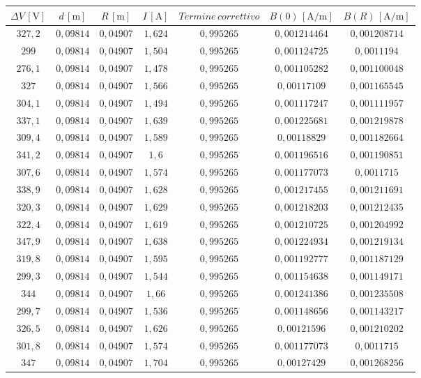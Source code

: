 \documentclass[]{article}
\begin{document}
\begin{table}
    \centering

\begin{tabular}{||c|c|c|c|c|c|c||}
    \hline
    $\Delta V\, [\text{V}] $ & $d\, [\text{m}] $ & $R\, [\text{m}] $ & $I\, [\text{A}] $ & $Termine \, correttivo $ & $B(0)\, [\text{A/m}] $ & $B(R)\, [\text{A/m}] $\\
    \hline\hline



    $327,2$ & $0,09814$ & $0,04907$ & $1,624$ & $0,995265$ & $0,001214464$ & $0,001208714$ \\\hline
    $299  $ & $0,09814$ & $0,04907$ & $1,504$ & $0,995265$ & $0,001124725$ & $0,0011194  $ \\\hline
    $276,1$ & $0,09814$ & $0,04907$ & $1,478$ & $0,995265$ & $0,001105282$ & $0,001100048$ \\\hline
    $327  $ & $0,09814$ & $0,04907$ & $1,566$ & $0,995265$ & $0,00117109 $ & $0,001165545$ \\\hline
    $304,1$ & $0,09814$ & $0,04907$ & $1,494$ & $0,995265$ & $0,001117247$ & $0,001111957$ \\\hline
    $337,1$ & $0,09814$ & $0,04907$ & $1,639$ & $0,995265$ & $0,001225681$ & $0,001219878$ \\\hline
    $309,4$ & $0,09814$ & $0,04907$ & $1,589$ & $0,995265$ & $0,00118829 $ & $0,001182664$ \\\hline
    $341,2$ & $0,09814$ & $0,04907$ & $1,6  $ & $0,995265$ & $0,001196516$ & $0,001190851$ \\\hline
    $307,6$ & $0,09814$ & $0,04907$ & $1,574$ & $0,995265$ & $0,001177073$ & $0,0011715  $ \\\hline
    $338,9$ & $0,09814$ & $0,04907$ & $1,628$ & $0,995265$ & $0,001217455$ & $0,001211691$ \\\hline
    $320,3$ & $0,09814$ & $0,04907$ & $1,629$ & $0,995265$ & $0,001218203$ & $0,001212435$ \\\hline
    $322,4$ & $0,09814$ & $0,04907$ & $1,619$ & $0,995265$ & $0,001210725$ & $0,001204992$ \\\hline
    $347,9$ & $0,09814$ & $0,04907$ & $1,638$ & $0,995265$ & $0,001224934$ & $0,001219134$ \\\hline
    $319,8$ & $0,09814$ & $0,04907$ & $1,595$ & $0,995265$ & $0,001192777$ & $0,001187129$ \\\hline
    $299,3$ & $0,09814$ & $0,04907$ & $1,544$ & $0,995265$ & $0,001154638$ & $0,001149171$ \\\hline
    $344  $ & $0,09814$ & $0,04907$ & $1,66 $ & $0,995265$ & $0,001241386$ & $0,001235508$ \\\hline
    $299,7$ & $0,09814$ & $0,04907$ & $1,536$ & $0,995265$ & $0,001148656$ & $0,001143217$ \\\hline
    $326,5$ & $0,09814$ & $0,04907$ & $1,626$ & $0,995265$ & $0,00121596 $ & $0,001210202$ \\\hline
    $301,8$ & $0,09814$ & $0,04907$ & $1,574$ & $0,995265$ & $0,001177073$ & $0,0011715  $ \\\hline
    $347  $ & $0,09814$ & $0,04907$ & $1,704$ & $0,995265$ & $0,00127429 $ & $0,001268256$ \\\hline


\end{tabular}
\end{table}
\end{document}
